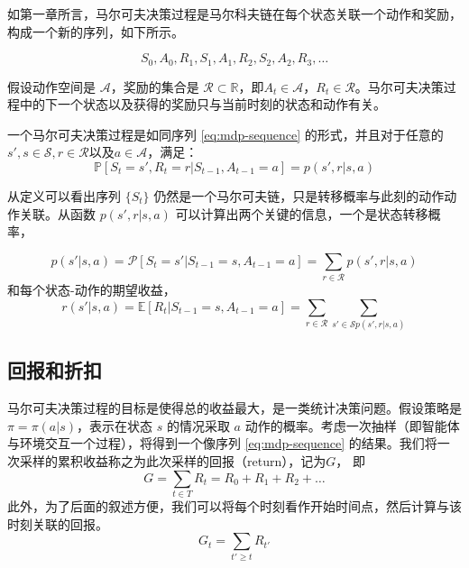 如第一章所言，马尔可夫决策过程是马尔科夫链在每个状态关联一个动作和奖励，构成一个新的序列，如下所示。

\begin{equation}
    S_0, A_0, R_1, S_1, A_1, R_2, S_2, A_2, R_3,\dots
    \label{eq:mdp-sequence}
\end{equation}

假设动作空间是 $\mathcal{A}$，奖励的集合是 $\mathcal{R} \subset \mathbb{R}$，即$A_t \in \mathcal{A}$，$R_t \in \mathcal{R}$。马尔可夫决策过程中的下一个状态以及获得的奖励只与当前时刻的状态和动作有关。

\begin{definition}[马尔可夫决策过程]
    一个马尔可夫决策过程是如同序列 \ref{eq:mdp-sequence} 的形式，并且对于任意的$s', s \in \mathcal{S}, r \in \mathcal{R} \text{以及} a\in \mathcal{A}$，满足：
    \begin{equation}
        \mathbb{P}[S_t = s', R_t = r| S_{t-1}, A_{t-1} = a] = p(s', r | s, a)
        \label{def:mdp}
    \end{equation}
\end{definition}

从定义可以看出序列 $\{S_t\}$ 仍然是一个马尔可夫链，只是转移概率与此刻的动作动作关联。从函数 $p(s', r|s, a)$ 可以计算出两个关键的信息，一个是状态转移概率，

\begin{equation}
    p(s'|s, a) = \mathcal{P}[S_t = s' | S_{t-1} = s, A_{t-1} = a] = \sum_{r\in \mathcal{R}} p(s', r|s, a)
\end{equation}
和每个状态-动作的期望收益，
\begin{equation}
    r(s' | s, a) = \mathbb{E} [R_t | S_{t-1} = s, A_{t-1} = a] = \sum_{r\in \mathcal{R}} \sum_{s' \in \mathcal{S} p(s', r | s, a)}
\end{equation}


\subsection{回报和折扣}
马尔可夫决策过程的目标是使得总的收益最大，是一类统计决策问题。假设策略是 $\pi = \pi(a | s)$，表示在状态 $s$ 的情况采取 $a$ 动作的概率。考虑一次抽样（即智能体与环境交互一个过程），将得到一个像序列 \ref{eq:mdp-sequence} 的结果。我们将一次采样的累积收益称之为此次采样的回报（return），记为$G$， 即
\begin{equation}
    G = \sum_{t \in T} R_t = R_0 + R_1 + R_2 + \dots
\end{equation}
此外，为了后面的叙述方便，我们可以将每个时刻看作开始时间点，然后计算与该时刻关联的回报。
\begin{equation}
    G_t = \sum_{t' \geq t} R_{t'}
\end{equation}

